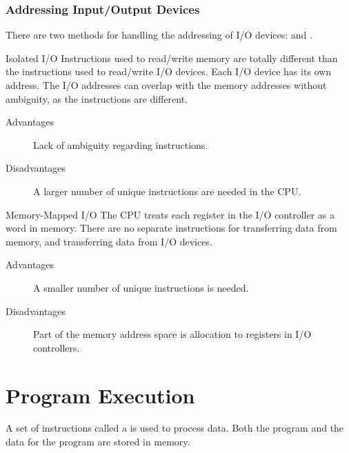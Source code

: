 \documentclass[\main/notes.tex]{subfiles}
\begin{document}
				\subsubsection{Addressing Input/Output Devices}
					There are two methods for handling the addressing of I/O devices:  and .
					\begin{definition}{Isolated I/O}
						Instructions used to read/write memory are totally different than the instructions used to read/write I/O devices. Each I/O device has its own address. The I/O addresses can overlap with the memory addresses without ambiguity, as the instructions are different.
						\begin{description}
							\item[Advantages] Lack of ambiguity regarding instructions.
							\item[Disadvantages] A larger number of unique instructions are needed in the CPU.
						\end{description}
					\end{definition}
					\begin{definition}{Memory-Mapped I/O}
						The CPU treats each register in the I/O controller as a word in memory. There are no separate instructions for transferring data from memory, and transferring data from I/O devices.
						\begin{description}
							\item[Advantages] A smaller number of unique instructions is needed.
							\item[Disadvantages] Part of the memory address space is allocation to registers in I/O controllers.
						\end{description}
					\end{definition}
			\section{Program Execution}
				A set of instructions called a  is used to process data. Both the program and the data for the program are stored in memory.
\end{document}
